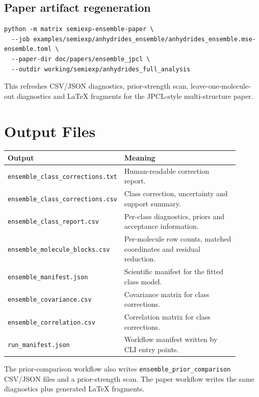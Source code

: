 \documentclass[11pt]{article}
\begin{document}
\subsection{Paper artifact regeneration}

\begin{lstlisting}[style=oracle]
python -m matrix semiexp-ensemble-paper \
  --job examples/semiexp/anhydrides_ensemble/anhydrides_ensemble.mse-ensemble.toml \
  --paper-dir doc/papers/ensemble_jpcl \
  --outdir working/semiexp/anhydrides_full_analysis
\end{lstlisting}

\noindent
This refreshes CSV/JSON diagnostics, prior-strength scan, leave-one-molecule-out
diagnostics and LaTeX fragments for the JPCL-style multi-structure paper.

\section{Output Files}

\begin{longtable}{@{}p{0.40\linewidth}p{0.50\linewidth}@{}}
\toprule
Output & Meaning \\
\midrule
\endhead
\texttt{ensemble\_class\_corrections.txt} & Human-readable correction report. \\
\texttt{ensemble\_class\_corrections.csv} & Class correction, uncertainty and
support summary. \\
\texttt{ensemble\_class\_report.csv} & Per-class diagnostics, priors and
acceptance information. \\
\texttt{ensemble\_molecule\_blocks.csv} & Per-molecule row counts, matched
coordinates and residual reduction. \\
\texttt{ensemble\_manifest.json} & Scientific manifest for the fitted class
model. \\
\texttt{ensemble\_covariance.csv} & Covariance matrix for class corrections. \\
\texttt{ensemble\_correlation.csv} & Correlation matrix for class corrections. \\
\texttt{run\_manifest.json} & Workflow manifest written by CLI entry points. \\
\bottomrule
\end{longtable}

The prior-comparison workflow also writes \texttt{ensemble\_prior\_comparison}
CSV/JSON files and a prior-strength scan.  The paper workflow writes the same
diagnostics plus generated LaTeX fragments.
\end{document}
